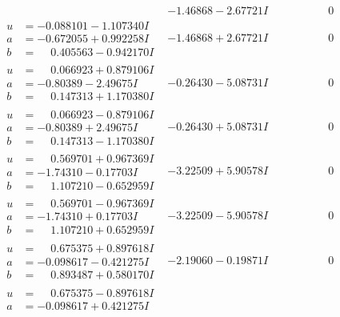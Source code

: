 \documentclass[1p]{elsarticle_modified}
\theoremstyle{definition}
\begin{document}
$$\begin{array}{c|c|c}
 & -1.46868 - 2.67721 I & \phantom{-0.000000 } 0 \\ \hline\begin{aligned}
u &= -0.088101 - 1.107340 I \\
a &= -0.672055 + 0.992258 I \\
b &= \phantom{-}0.405563 - 0.942170 I\end{aligned}
 & -1.46868 + 2.67721 I & \phantom{-0.000000 } 0 \\ \hline\begin{aligned}
u &= \phantom{-}0.066923 + 0.879106 I \\
a &= -0.80389 - 2.49675 I \\
b &= \phantom{-}0.147313 + 1.170380 I\end{aligned}
 & -0.26430 - 5.08731 I & \phantom{-0.000000 } 0 \\ \hline\begin{aligned}
u &= \phantom{-}0.066923 - 0.879106 I \\
a &= -0.80389 + 2.49675 I \\
b &= \phantom{-}0.147313 - 1.170380 I\end{aligned}
 & -0.26430 + 5.08731 I & \phantom{-0.000000 } 0 \\ \hline\begin{aligned}
u &= \phantom{-}0.569701 + 0.967369 I \\
a &= -1.74310 - 0.17703 I \\
b &= \phantom{-}1.107210 - 0.652959 I\end{aligned}
 & -3.22509 + 5.90578 I & \phantom{-0.000000 } 0 \\ \hline\begin{aligned}
u &= \phantom{-}0.569701 - 0.967369 I \\
a &= -1.74310 + 0.17703 I \\
b &= \phantom{-}1.107210 + 0.652959 I\end{aligned}
 & -3.22509 - 5.90578 I & \phantom{-0.000000 } 0 \\ \hline\begin{aligned}
u &= \phantom{-}0.675375 + 0.897618 I \\
a &= -0.098617 - 0.421275 I \\
b &= \phantom{-}0.893487 + 0.580170 I\end{aligned}
 & -2.19060 - 0.19871 I & \phantom{-0.000000 } 0 \\ \hline\begin{aligned}
u &= \phantom{-}0.675375 - 0.897618 I \\
a &= -0.098617 + 0.421275 I \\

\end{aligned}
\end{array}$$
\end{document}
